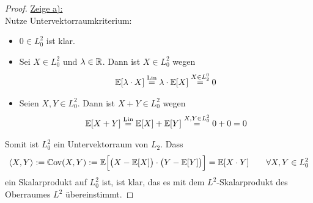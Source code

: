 \begin{proof}
	\underline{Zeige a):}\\
	Nutze Untervektorraumkriterium:
	\begin{itemize}
		\item $0\in L_0^2$ ist klar.
		\item Sei $X\in L_0^2$ und $\lambda\in\mathbb{R}$. Dann ist $X\in L_0^2$ wegen
		\begin{align*}
			\mathbb{E}[\lambda\cdot X]\overset{\text{Lin}}{=}\lambda\cdot\mathbb{E}[X]\overset{X\in L_2^0}{=}0
		\end{align*}
		\item Seien $X,Y\in L_0^2$. Dann ist $X+Y\in L_0^2$ wegen
		\begin{align*}
			\mathbb{E}[X+Y]\overset{\text{Lin}}{=}\mathbb{E}[X]+\mathbb{E}[Y]\overset{X,Y\in L_0^2}{=}0+0=0
		\end{align*}
	\end{itemize}
	Somit ist $L_0^2$ ein Untervektorraum von $L_2$. Dass
	\begin{align*}
		\langle X,Y\rangle:=\mathbb{C}\text{ov}(X,Y):=
		\mathbb{E}\Big[\big(X-\mathbb{E}[X]\big)\cdot\big(Y-\mathbb{E}[Y]\big)\Big]
		=\mathbb{E}[X\cdot Y]
		\qquad\forall X,Y\in L_0^2
	\end{align*}
	ein Skalarprodukt auf $L_0^2$ ist, ist klar, das es mit dem $L^2$-Skalarprodukt des Oberraumes $L^2$ übereinstimmt.


\end{proof}
